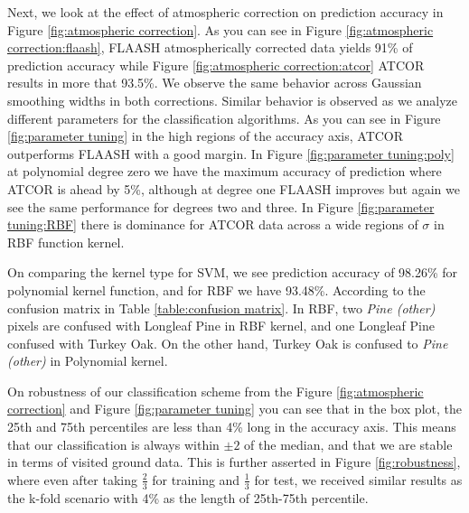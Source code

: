 \documentclass[remotesensing,article,accept,moreauthors,pdftex,12pt,a4paper]{mdpi}
\begin{document}

Next, we look at the effect of atmospheric correction on prediction accuracy in Figure \ref{fig:atmospheric correction}. 
As you can see in Figure \ref{fig:atmospheric correction:flaash}, FLAASH atmospherically corrected data yields 91\% of prediction accuracy while Figure \ref{fig:atmospheric correction:atcor} ATCOR results in more that 93.5\%. 
We observe the same behavior across Gaussian smoothing widths in both corrections. 
Similar behavior is observed as we analyze different parameters for the classification algorithms. 
As you can see in Figure \ref{fig:parameter tuning} in the high regions of the accuracy axis, ATCOR outperforms FLAASH with a good margin. 
In Figure \ref{fig:parameter tuning:poly} at polynomial degree zero we have the maximum accuracy of prediction where ATCOR is ahead by 5\%, although at degree one FLAASH improves but again we see the same performance for degrees two and three. 
In Figure \ref{fig:parameter tuning:RBF} there is dominance for ATCOR data across a wide regions of $\sigma$ in RBF function kernel.

On comparing the kernel type for SVM, we see prediction accuracy of 98.26\% for polynomial kernel function, and for RBF we have 93.48\%. 
According to the confusion matrix in Table \ref{table:confusion matrix}. 
In RBF, two \textit{Pine (other)} pixels are confused with Longleaf Pine in RBF kernel, and one Longleaf Pine confused with Turkey Oak. 
On the other hand, Turkey Oak is confused to \textit{Pine (other)} in Polynomial kernel.





On robustness of our classification scheme from the Figure \ref{fig:atmospheric correction} and Figure \ref{fig:parameter tuning} you can see that in the box plot, the 25th and 75th percentiles are less than 4\% long in the accuracy axis. 
This means that our classification is always within $\pm 2$ of the median, and that we are stable in terms of visited ground data. 
This is further asserted in Figure \ref{fig:robustness}, where even after taking $\frac{2}{3}$ for training and $\frac{1}{3}$ for test, we received similar results as the k-fold scenario with 4\% as the length of 25th-75th percentile. 
\end{document}
